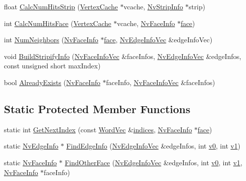 \begin{CompactItemize}
\item 
float \hyperlink{class_nv_stripifier_e34f56d66a8a81e65f29a44a8f7ba285}{CalcNumHitsStrip} (\hyperlink{class_vertex_cache}{VertexCache} $\ast$vcache, \hyperlink{class_nv_strip_info}{NvStripInfo} $\ast$strip)
\item 
int \hyperlink{class_nv_stripifier_351bf050700631c934ce6129cb0912ea}{CalcNumHitsFace} (\hyperlink{class_vertex_cache}{VertexCache} $\ast$vcache, \hyperlink{class_nv_face_info}{NvFaceInfo} $\ast$\hyperlink{glext_8h_676ca580c460c0154eb58200433d2a9e}{face})
\item 
int \hyperlink{class_nv_stripifier_38f2f9e8caf2c33ef6b61bfa65012762}{NumNeighbors} (\hyperlink{class_nv_face_info}{NvFaceInfo} $\ast$\hyperlink{glext_8h_676ca580c460c0154eb58200433d2a9e}{face}, \hyperlink{_nv_tri_strip_objects_8h_58592f6a13118931e843d05574249663}{NvEdgeInfoVec} \&edgeInfoVec)
\item 
void \hyperlink{class_nv_stripifier_1412a60d8d339102fb3514fdb01480cd}{BuildStripifyInfo} (\hyperlink{_nv_tri_strip_objects_8h_93d0a2f26991e801145908bc4d3d9156}{NvFaceInfoVec} \&faceInfos, \hyperlink{_nv_tri_strip_objects_8h_58592f6a13118931e843d05574249663}{NvEdgeInfoVec} \&edgeInfos, const unsigned short maxIndex)
\item 
bool \hyperlink{class_nv_stripifier_41b02b19ec351121bdd68b4d063d5526}{AlreadyExists} (\hyperlink{class_nv_face_info}{NvFaceInfo} $\ast$faceInfo, \hyperlink{_nv_tri_strip_objects_8h_93d0a2f26991e801145908bc4d3d9156}{NvFaceInfoVec} \&faceInfos)
\end{CompactItemize}
\subsection*{Static Protected Member Functions}
\begin{CompactItemize}
\item 
static int \hyperlink{class_nv_stripifier_fb2b61dc693b71abfc224838a6a8e9f6}{GetNextIndex} (const \hyperlink{_nv_tri_strip_objects_8h_0e4014090627df01c862364a6acc4020}{WordVec} \&\hyperlink{class_nv_stripifier_7ddcd00526720153c7518a52ff4e9160}{indices}, \hyperlink{class_nv_face_info}{NvFaceInfo} $\ast$\hyperlink{glext_8h_676ca580c460c0154eb58200433d2a9e}{face})
\item 
static \hyperlink{class_nv_edge_info}{NvEdgeInfo} $\ast$ \hyperlink{class_nv_stripifier_c2d08361cafc6f73b8160d82c1305441}{FindEdgeInfo} (\hyperlink{_nv_tri_strip_objects_8h_58592f6a13118931e843d05574249663}{NvEdgeInfoVec} \&edgeInfos, int \hyperlink{glext__bak_8h_8f5597b6002609ead33af221dcf29790}{v0}, int \hyperlink{glext__bak_8h_435c176a02c061b43e19bdf7c86cceae}{v1})
\item 
static \hyperlink{class_nv_face_info}{NvFaceInfo} $\ast$ \hyperlink{class_nv_stripifier_0f2a262590bf7bbfbf37d9fc720dd4ef}{FindOtherFace} (\hyperlink{_nv_tri_strip_objects_8h_58592f6a13118931e843d05574249663}{NvEdgeInfoVec} \&edgeInfos, int \hyperlink{glext__bak_8h_8f5597b6002609ead33af221dcf29790}{v0}, int \hyperlink{glext__bak_8h_435c176a02c061b43e19bdf7c86cceae}{v1}, \hyperlink{class_nv_face_info}{NvFaceInfo} $\ast$faceInfo)
\end{CompactItemize}
